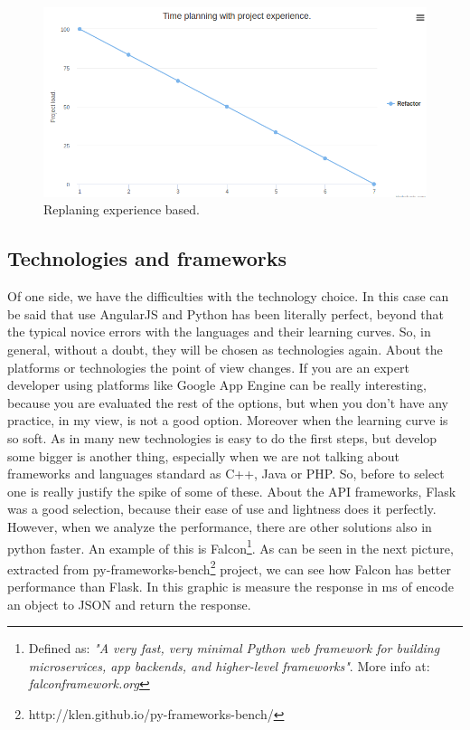 \begin{figure}[H]
  \includegraphics[scale=0.4]{img/graphics/redo.png}
  \centering
  \caption{Replaning experience based.}
\end{figure}

\subsection{Technologies and frameworks}

Of one side, we have the difficulties with the technology choice. In this case
can be said that use AngularJS and Python has been literally perfect, beyond
that the typical novice errors with the languages and their learning curves.
So, in general, without a doubt, they will be chosen as technologies again.
\intro
About the platforms or technologies the point of view changes. If you are
an expert developer using platforms like Google App Engine can be really
interesting, because you are evaluated the rest of the options, but when
you don't have any practice, in my view, is not a good option. Moreover when
the learning curve is so soft.
\intro
As in many new technologies is easy to do the first steps, but develop some bigger
is another thing, especially when we are not talking about frameworks and
languages standard as C++, Java or PHP. So, before to select one is really justify
the spike of some of these.
\intro
About the API frameworks, Flask was a good selection, because their ease of use
and lightness does it perfectly. However, when we analyze the performance, there are
other solutions also in python faster. An example of this is Falcon\footnote{Defined as: \textit{"A
very fast, very minimal Python web framework for building microservices, app backends,
and higher-level frameworks"}. More info at: \textit{falconframework.org}}. As can be
seen in the next picture, extracted from py-frameworks-bench\footnote{
http://klen.github.io/py-frameworks-bench/} project, we can see how Falcon has
better performance than Flask. In this graphic is measure the response in ms
of encode an object to JSON and return the response.

